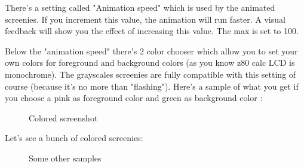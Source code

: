 \documentclass[10pt]{report}
\begin{document}
There's a setting called "Animation speed" which is used by the animated screenies.\newline
If you increment this value, the animation will run faster.\newline
A visual feedback will show you the effect of increasing this value.\newline
The max is set to 100.\newline

Below the "animation speed" there's 2 color chooser which allow you to set your own colors for foreground and background colors (as you know z80 calc LCD is monochrome).\newline
The grayscales screenies are fully compatible with this setting of course (because it's no more than "flashing").\newline
Here's a sample of what you get if you choose a pink as foreground color and green as background color :\newline
\begin{figure}[H]
\centering
{}
\caption{Colored screenshot}
\end{figure}

Let's see a bunch of colored screenies:\newline
\begin{figure}[H]
\centering
{}
\caption{Some other samples}
\end{figure}
\end{document}
